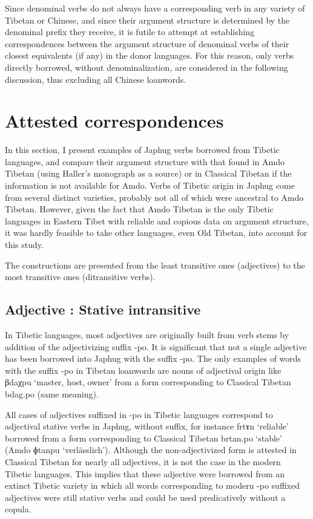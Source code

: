 \documentclass[oldfontcommands,oneside,a4paper,11pt]{article}
\newcommand{\ipa}[1]{{\phon \mbox{#1}}} %
\begin{document}
Since denominal verbs do not always have a corresponding verb in any variety of Tibetan or Chinese, and since their argument structure is determined by the denominal prefix they receive, it is futile to attempt at establishing correspondences between the argument structure of denominal verbs of their closest equivalents (if any) in the donor languages. For this reason, only verbs directly borrowed, without denominalization, are considered in the following discussion, thus excluding all Chinese loanwords.
 
  \section{Attested correspondences} 
 In this section, I present examples of Japhug verbs borrowed from Tibetic languages, and compare their argument structure with that found in Amdo Tibetan (using Haller's \citeyear{haller04themchen} monograph as a source) or in Classical Tibetan if the information is not available for Amdo. Verbs of Tibetic origin in Japhug come from several distinct varieties, probably not all of which were ancestral to Amdo Tibetan. However, given the fact that Amdo Tibetan is the only Tibetic languages in Eastern Tibet with reliable and copious data on argument structure, it was hardly feasible to take other languages, even Old Tibetan, into account for this study.
 
 The constructions are presented from the least transitive ones (adjectives) to the most transitive ones (ditransitive verbs). 
   
  \subsection{Adjective : Stative intransitive}  
In Tibetic languages, most adjectives are originally built from verb stems by addition of the adjectivizing suffix \ipa{-po}. It is significant that not a single adjective has been borrowed into Japhug with the suffix \ipa{-po}. The only examples of words with the suffix \ipa{-po} in Tibetan loanwords are nouns of adjectival origin like \ipa{βdaχpu} `master, host, owner' from a form corresponding to Classical Tibetan \ipa{bdag.po} (same meaning).

All cases of adjectives suffixed in \ipa{-po} in Tibetic languages correspond to adjectival stative verbs in Japhug, without suffix, for instance \ipa{frtɤn} `reliable' borrowed from a form corresponding to Classical Tibetan \ipa{brtan.po} `stable' (Amdo \ipa{ɸtanpu} `verlässlich'). Although the non-adjectivized form is attested in Classical Tibetan for nearly all adjectives, it is not the case in the modern Tibetic languages. This implies that these adjective were borrowed from an extinct Tibetic variety in which all words corresponding to modern \ipa{-po} suffixed adjectives were still stative verbs and could be used predicatively without a copula.
\end{document}
